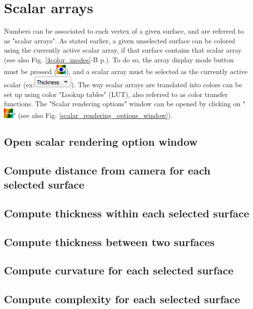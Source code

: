 \section{Scalar arrays}
Numbers can be associated to each vertex of a given surface, and are referred to as "scalar arrays". 
As stated earlier, a given unselected surface can be colored using the currently active scalar array, if that surface contains that scalar array (see also Fig. \ref{4color_modes}-B p.\pageref{4color_modes}). To do so, the array display mode button must be pressed (\includegraphics[scale=0.7]{images/04/show_color_scale.png}), and a scalar array must be selected as the currently active scalar (ex:\includegraphics[scale=0.5]{images/04/scalarcombo_scalar.png}). The way scalar arrays are translated into colors can be set up using color "Lookup tables" (LUT), also referred to as color transfer functions. The "Scalar rendering options" window can be opened by clicking on "\includegraphics[scale=0.7]{images/04/color_scale_edit.png}" (see also Fig. \ref{scalar_rendering_options_window}).

\subsection{Open scalar rendering option window}
\subsection{Compute distance from camera for each selected surface}
\subsection{Compute thickness within each selected surface}
\subsection{Compute thickness between two surfaces}
\subsection{Compute curvature for each selected surface}
\subsection{Compute complexity for each selected surface}
